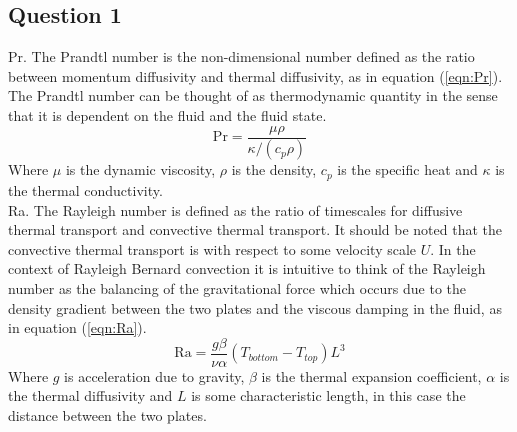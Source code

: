 \documentclass[10pt,a4paper]{article}
\begin{document}
\newpage
\subsection{Question 1}

Pr. The Prandtl number is the non-dimensional number defined as the ratio between momentum diffusivity and thermal diffusivity, as in equation (\ref{eqn:Pr}). The Prandtl number can be thought of as thermodynamic quantity in the sense that it is dependent on the fluid and the fluid state.
\begin{equation}
\text{Pr} = \frac{\mu \rho}{\kappa/(c_p \rho)} 
\label{eqn:Pr}
\end{equation}
Where $\mu$ is the dynamic viscosity, $\rho$ is the density, $c_p$ is the specific heat and $\kappa$ is the thermal conductivity.\\

\noindent Ra. The Rayleigh number is defined as the ratio of timescales for diffusive thermal transport and convective thermal transport. It should be noted that the convective thermal transport is with respect to some velocity scale $U$. In the context of Rayleigh Bernard convection it is intuitive to think of the Rayleigh number as the balancing of the gravitational force which occurs due to the density gradient between the two plates and the viscous damping in the fluid, as in equation (\ref{eqn:Ra}).
\begin{equation}
\text{Ra} = \frac{g\beta}{\nu \alpha}(T_{bottom} - T_{top})L^3
\label{eqn:Ra}
\end{equation}
Where $g$ is acceleration due to gravity, $\beta$ is the thermal expansion coefficient, $\alpha$ is the thermal diffusivity and $L$ is some characteristic length, in this case the distance between the two plates.\\
\end{document}

